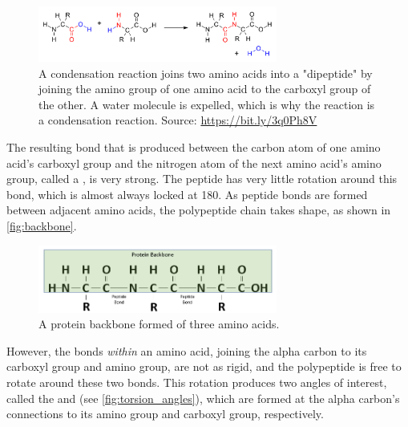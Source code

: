 \begin{figure}[h]
	\centering
	\mySfFamily
	\includegraphics[width = 0.7\textwidth]{../images/dipeptide_reaction.png}
	\caption{A condensation reaction joins two amino acids into a "dipeptide" by joining the amino group of one amino acid to the carboxyl group of the other. A water molecule is expelled, which is why the reaction is a condensation reaction. Source: \url{https://bit.ly/3q0Ph8V}}
	\label{fig:dipeptide_reaction}
\end{figure}

The resulting bond that is produced between the carbon atom of one amino acid's carboxyl group and the nitrogen atom of the next amino acid's amino group, called a , is very strong. The peptide has very little rotation around this bond, which is almost always locked at 180\textdegree. As peptide bonds are formed between adjacent amino acids, the polypeptide chain takes shape, as shown in \autoref{fig:backbone}.

\begin{figure}[h]
	\centering
	\mySfFamily
	\includegraphics[width = 0.7\textwidth]{../images/Backbone.png}
	\caption{A protein backbone formed of three amino acids.}
	\label{fig:backbone}
\end{figure}

However, the bonds \textit{within} an amino acid, joining the alpha carbon to its carboxyl group and amino group, are not as rigid, and the polypeptide is free to rotate around these two bonds. This rotation produces two angles of interest, called the  and  (see \autoref{fig:torsion_angles}), which are formed at the alpha carbon's connections to its amino group and carboxyl group, respectively.

